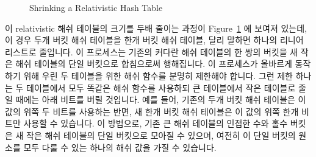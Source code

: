 \fi

\begin{figure}[tb]
\centering
{}
\caption{Shrinking a Relativistic Hash Table}
\label{fig:datastruct:Shrinking a Relativistic Hash Table}
\end{figure}

이 relativistic 해쉬 테이블의 크기를 두배 줄이는 과정이
Figure~\ref{fig:datastruct:Shrinking a Relativistic Hash Table}
에 보여져 있는데, 이 경우 두개 버킷 해쉬 테이블을 한개 버킷 해쉬 테이블, 달리
말하면 하나의 리니어 리스트로 줄입니다.
이 프로세스는 기존의 커다란 해쉬 테이블의 한 쌍의 버킷을 새 작은 해쉬 테이블의
단일 버킷으로 합침으로써 행해집니다.
이 프로세스가 올바르게 동작하기 위해 우린 두 테이블을 위한 해쉬 함수를 분명히
제한해야 합니다.
그런 제한 하나는 두 테이블에서 모두 똑같은 해쉬 함수를 사용하되 큰 테이블에서
작은 테이블로 줄일 때에는 아래 비트를 버릴 것입니다.
예를 들어, 기존의 두개 버킷 해쉬 테이블은 이 값의 위쪽 두 비트를 사용하는 반면,
새 한개 버킷 해쉬 테이블은 이 값의 위쪽 한개 비트만 사용할 수 있습니다.
이 방법으로, 기존 큰 해쉬 테이블의 인접한 수와 홀수 버킷은 새 작은 해쉬
테이블의 단일 버킷으로 모아질 수 있으며, 여전히 이 단일 버킷의 원소를 모두 다룰
수 있는 하나의 해쉬 값을 가질 수 있습니다.

